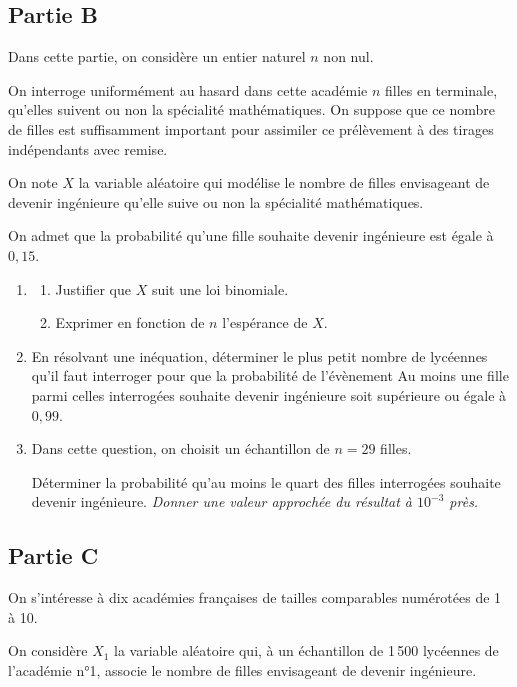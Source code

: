 \subsection*{Partie B}

Dans cette partie, on considère un entier naturel $n$ non nul.

 On interroge uniformément au hasard dans cette académie $n$ filles en terminale, qu'elles suivent ou non la spécialité mathématiques. On suppose que ce nombre de filles est suffisamment important pour assimiler ce prélèvement à des tirages indépendants avec remise.

On note $X$ la variable aléatoire qui modélise le nombre de filles envisageant de devenir ingénieure qu'elle suive ou non la spécialité mathématiques.

On admet que la probabilité qu'une fille souhaite devenir ingénieure est égale à $0{,}15$.

\medskip

\begin{enumerate}
\item[1.] 
	\begin{enumerate}[label=\alph*.]
		\item Justifier que $X$ suit une loi binomiale.
		\item Exprimer en fonction de $n$ l'espérance de $X$.
	\end{enumerate}
\item[2.] En résolvant une inéquation, déterminer le plus petit nombre de lycéennes qu'il faut interroger pour que la probabilité de l'évènement \og Au moins une fille parmi celles interrogées souhaite devenir ingénieure \fg soit supérieure ou égale à $0{,}99$.
\item[3.] Dans cette question, on choisit un échantillon de $n = 29$ filles.

Déterminer la probabilité qu'au moins le quart des filles interrogées souhaite devenir ingénieure. \textit{Donner une valeur approchée du résultat à $10^{-3}$ près.}
\end{enumerate}

\subsection*{Partie C}

On s'intéresse à dix académies françaises de tailles comparables numérotées de 1 à 10.

On considère $X_1$ la variable aléatoire qui, à un échantillon de 1\,500 lycéennes de l'académie n°1, associe le nombre de filles envisageant de devenir ingénieure.

